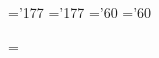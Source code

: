 \def\Sim{\mathop{\sim}}
\def\card{\mathop{\rm card}\nolimits}
\def\dim{\mathop{\rm dim}\nolimits}
\def\det{\mathop{\hbox{\rm dét}}\nolimits}
\def\mod{\mathop{\rm mod}\nolimits}
\def\sgn{\mathop{\rm sgn}\nolimits}



\def\quote{\leavevmode\raise.24ex\hbox{$\scriptscriptstyle\langle\!\langle\>$}}    %
\def\etouq{\leavevmode\raise.24ex\hbox{$\scriptscriptstyle\>\rangle\!\rangle$}}    %



\def\PAR{\par}


\def\signeat{\catcode`@=11}





\skewchar\eighti='177 \skewchar\sixi='177
\skewchar\eightsy='60 \skewchar\sixsy='60

%
%
%
\let\footnotea=\footnote
\newinsert\footins
\def\footnote#1{\let\@sf\empty %
  \ifhmode\edef\@sf{\spacefactor\the\spacefactor}\/\fi
\hbox{$^{(#1)}$}\@sf\vfootnote{#1.}}
\def\vfootnote#1{\insert\footins\bgroup
  \interlinepenalty\interfootnotelinepenalty
  \splittopskip\ht\strutbox %
  \splitmaxdepth\dp\strutbox \floatingpenalty\@MM
  \leftskip\z@skip \rightskip\z@skip \spaceskip\z@skip \xspaceskip\z@skip
  \textindent{#1}\footstrut\futurelet\next\fo@t}
\def\fo@t{\ifcat\bgroup\noexpand\next \let\next\f@@t
  \else\let\next\f@t\fi \next}
\def\f@@t{\bgroup\aftergroup\@foot\let\next}
\def\f@t#1{#1\@foot}
\def\@foot{\strut\egroup}
\def\footstrut{\vbox to\splittopskip{}}
\skip\footins=\bigskipamount %
\count{} %
\dimen\footins=8in %

